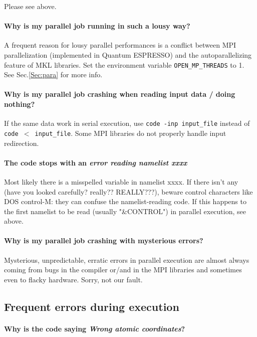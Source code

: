 \documentclass[12pt,a4paper]{article}
\def\qe{{\sc Quantum ESPRESSO}}
\begin{document}
Please see above.

\paragraph{Why is my parallel job running in such a lousy way?}

A frequent reason for lousy parallel performances is a
conflict between MPI parallelization (implemented in \qe)
and the autoparallelizing feature of MKL libraries. Set the
environment variable \texttt{OPEN\_MP\_THREADS} to 1. 
See Sec.\ref{Sec:para} for more info.

\paragraph{Why is my parallel job crashing when reading input data / doing nothing?}

If the same data work in serial execution, use
\texttt{code -inp input\_file} instead of \texttt{code $<$ input\_file}. 
Some MPI libraries do not properly handle input redirection.

\paragraph{The code stops with an {\em error reading namelist xxxx}}

Most likely there is a misspelled variable in namelist xxxx.
If there isn't any (have you looked carefully? really?? REALLY???), 
beware control characters like DOS control-M: they can confuse
the namelist-reading code. If this happens to the first namelist 
to be read (usually "\&CONTROL") in parallel execution, see above.

\paragraph{Why is my parallel job crashing with mysterious errors?}

Mysterious, unpredictable, erratic errors in parallel execution are
almost always coming from bugs in the compiler or/and in the MPI 
libraries and sometimes even to flacky hardware. Sorry, not our fault.

\subsection{Frequent errors during execution}

\paragraph{Why is the code saying {\em Wrong atomic coordinates}?}
\end{document}
